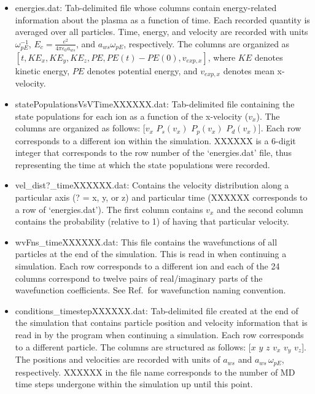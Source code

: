 \documentclass{article}
\begin{document}
	\begin{itemize}
		
		\item energies.dat: Tab-delimited file whose columns contain energy-related information about the plasma as a function of time. Each recorded quantity is averaged over all particles. Time, energy, and velocity are recorded with units $\omega_{pE}^{-1}$, $E_{c}=\frac{e^2}{4\pi \epsilon_{0} a_{ws}}$, and $a_{ws}\omega_{pE}$, respectively. The columns are organized as $[t,KE_{x}, KE_{y}, KE_{z}, PE, PE(t)-PE(0), v_{exp,x}]$, where $KE$ denotes kinetic energy, $PE$ denotes potential energy, and $v_{exp,x}$ denotes mean x-velocity. 
		
		\item statePopulationsVsVTimeXXXXXX.dat: Tab-delimited file containing the state populations for each ion as a function of the x-velocity ($v_{x}$). The columns are organized as follows: [$v_{x}$ $P_{s}(v_{x})$ $P_{p}(v_{x})$ $P_d(v_{x})$]. Each row corresponds to a different ion within the simulation. XXXXXX is a 6-digit integer that corresponds to the row number of the `energies.dat' file, thus representing the time at which the state populations were recorded.
		
		\item vel\_dist?\_timeXXXXXX.dat: Contains the velocity distribution along a particular axis (? = x, y, or z) and particular time (XXXXXX corresponds to a row of `energies.dat'). The first column contains $v_{x}$ and the second column contains the probability (relative to 1) of having that particular velocity.
		
		\item wvFns\_timeXXXXXX.dat: This file contains the wavefunctions of all particles at the end of the simulation. This is read in when continuing a simulation. Each row corresponds to a different ion and each of the 24 columns correspond to twelve pairs of real/imaginary parts of the wavefunction coefficients. See Ref.\,\cite{tkl2018} for wavefunction naming convention.
		
		\item conditions\_timestepXXXXXX.dat: Tab-delimited file created at the end of the simulation that contains particle position and velocity information that is read in by the program when continuing a simulation. Each row corresponds to a different particle. The columns are structured as follows: [$x$ $y$ $z$ $v_{x}$ $v_{y}$ $v_{z}$]. The positions and velocities are recorded with units of $a_{ws}$ and $a_{ws}\,\omega_{pE}$, respectively. XXXXXX in the file name corresponds to the number of MD time steps undergone within the simulation up until this point.
		

\end{itemize}
\end{document}
